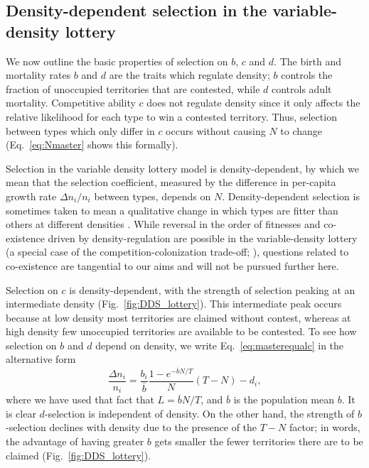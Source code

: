 \documentclass[12pt]{article}
\begin{document}
\subsection*{Density-dependent selection in the variable-density lottery}

We now outline the basic properties of selection on $b$, $c$ and $d$. The birth and mortality rates $b$ and $d$ are the traits which regulate density; $b$ controls the fraction of unoccupied territories that are contested, while $d$ controls adult mortality. Competitive ability $c$ does not regulate density since it only affects the relative likelihood for each type to win a contested territory. Thus, selection between types which only differ in $c$ occurs without causing $N$ to change (Eq.~\eqref{eq:Nmaster} shows this formally). 

Selection in the variable density lottery model is density-dependent, by which we mean that  the selection coefficient, measured by the difference in per-capita growth rate $\Delta n_i/n_i$ between types, depends on $N$. Density-dependent selection is sometimes taken to mean a qualitative change in which types are fitter than others at different densities \citep{travis_2013}. While reversal in the order of fitnesses and co-existence driven by density-regulation are possible in the variable-density lottery (a special case of the competition-colonization trade-off; \citealt{levins_71,tilman_94,bolker_99}), questions related to co-existence are tangential to our aims and will not be pursued further here. 

Selection on $c$ is density-dependent, with the strength of selection  peaking at an intermediate density (Fig.~\ref{fig:DDS_lottery}). This intermediate peak occurs because at low density most territories are claimed without contest, whereas at high density few unoccupied territories are available to be contested. To see how selection on $b$ and $d$ depend on density, we write Eq.~\eqref{eq:masterequalc} in the alternative form
\begin{equation}
\frac{\Delta n_i}{n_i} = \frac{b_i}{\overline{b}}\frac{1-e^{-\overline{b}N/T}}{N}(T-N)-d_i, \label{eq:bdensitydependence}
\end{equation}
where we have used that fact that $L=\overline{b}N/T$, and $\overline{b}$ is the population mean $b$. It is clear $d$-selection is independent of density. On the other hand, the strength of $b$-selection declines with density due to the presence of the $T-N$ factor; in words, the advantage of having greater $b$ gets smaller the fewer territories there are to be claimed (Fig.~\ref{fig:DDS_lottery}). 
\end{document}
